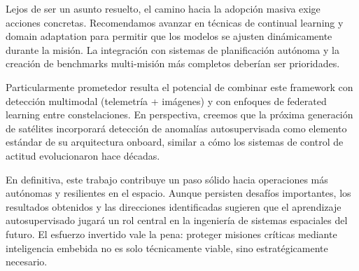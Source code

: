 Lejos de ser un asunto resuelto, el camino hacia la adopción masiva exige acciones concretas. Recomendamos avanzar en técnicas de continual learning y domain adaptation para permitir que los modelos se ajusten dinámicamente durante la misión. La integración con sistemas de planificación autónoma y la creación de benchmarks multi-misión más completos deberían ser prioridades.

Particularmente prometedor resulta el potencial de combinar este framework con detección multimodal (telemetría + imágenes) y con enfoques de federated learning entre constelaciones. En perspectiva, creemos que la próxima generación de satélites incorporará detección de anomalías autosupervisada como elemento estándar de su arquitectura onboard, similar a cómo los sistemas de control de actitud evolucionaron hace décadas.

En definitiva, este trabajo contribuye un paso sólido hacia operaciones más autónomas y resilientes en el espacio. Aunque persisten desafíos importantes, los resultados obtenidos y las direcciones identificadas sugieren que el aprendizaje autosupervisado jugará un rol central en la ingeniería de sistemas espaciales del futuro. El esfuerzo invertido vale la pena: proteger misiones críticas mediante inteligencia embebida no es solo técnicamente viable, sino estratégicamente necesario.